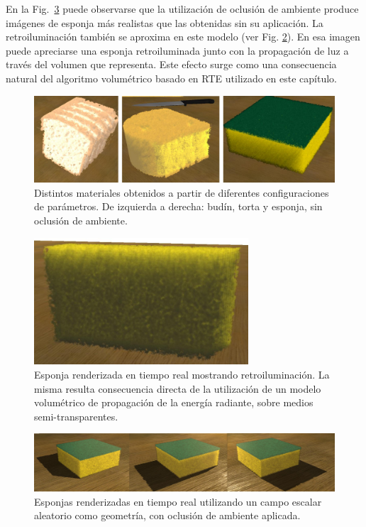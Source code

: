 En la Fig.~\ref{fg:sponges} puede observarse que la utilización de oclusión de ambiente produce imágenes de esponja más realistas que las obtenidas sin su aplicación.
La retroiluminación también se aproxima en este modelo (ver Fig. \ref{fg:fig7}).
En esa imagen puede apreciarse una esponja retroiluminada junto con la propagación de luz a través del volumen que representa.
Este efecto surge como una consecuencia natural del algoritmo volumétrico basado en RTE utilizado en este capítulo.

\begin{figure}[htb!]
  \centerline{\includegraphics[width=13cm]{fig6}}
  \caption[Budín, torta y esponja renderizados]{Distintos materiales obtenidos a partir de diferentes configuraciones de parámetros. De izquierda a derecha: budín, torta y esponja, sin oclusión de ambiente. }
  \label{fg:fig6}

\end{figure}

\begin{figure}[htb!]
  \centerline{\includegraphics[width=8cm]{fig7}}
  \caption[Esponja retroiluminada.]{Esponja renderizada en tiempo real mostrando retroiluminación. La misma resulta consecuencia directa de la utilización de un modelo volumétrico de propagación de la energía radiante, sobre medios semi-transparentes.}
  \label{fg:fig7}
\end{figure}


\begin{figure}
  \centerline{\includegraphics[width=13cm]{figures/sponges}}
  \caption{Esponjas renderizadas en tiempo real utilizando un campo escalar aleatorio como geometría, con oclusión de ambiente aplicada.}
  \label{fg:sponges}
\end{figure}

